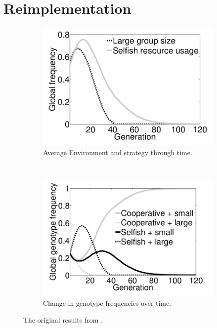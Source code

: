 \documentclass[11pt]{ecsarticle}
\begin{document}
\section{Reimplementation}
\begin{figure}
        \centering
        \begin{subfigure}[b]{0.4\textwidth}
                \includegraphics[width=\textwidth]{orig_a.png}
                \caption{Average Environment and strategy through time.}
                \label{fig:orig:A}
        \end{subfigure}%
        ~ %
        \begin{subfigure}[b]{0.4\textwidth}
                \includegraphics[width=\textwidth]{orig_b.png}
                \caption{Change in genotype frequencies over time.}
                \label{fig:orig:B}
        \end{subfigure}
        \caption{The original results from \cite{powers2007individual}.}\label{fig:animals}
\end{figure}
\end{document}
